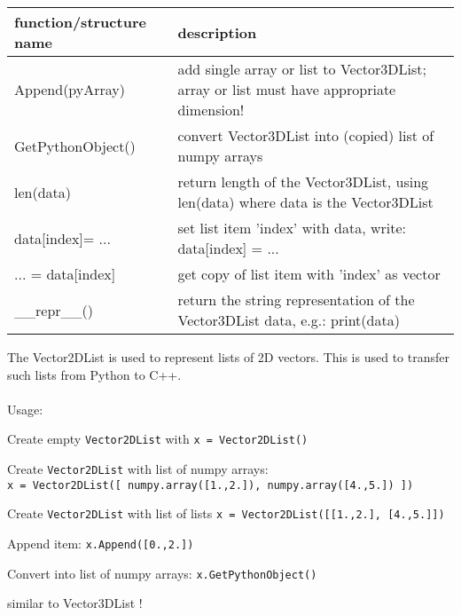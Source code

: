 \begin{center}
\footnotesize
\begin{longtable}{| p{8cm} | p{8cm} |} 
\hline
{\bf function/structure name} & {\bf description}\\ \hline
  Append(pyArray) & add single array or list to Vector3DList; array or list must have appropriate dimension!\\ \hline 
  GetPythonObject() & convert Vector3DList into (copied) list of numpy arrays\\ \hline 
  len(data) & return length of the Vector3DList, using len(data) where data is the Vector3DList\\ \hline 
  data[index]= ... & set list item 'index' with data, write: data[index] = ...\\ \hline 
  ... = data[index] & get copy of list item with 'index' as vector\\ \hline 
  \_\_repr\_\_() & return the string representation of the Vector3DList data, e.g.: print(data)\\ \hline 
\end{longtable}
\end{center}

The Vector2DList is used to represent lists of 2D vectors. This is used to transfer such lists from Python to C++. \\ \\ Usage: \bi
  \item Create empty \texttt{Vector2DList} with \texttt{x = Vector2DList()} 
  \item Create \texttt{Vector2DList} with list of numpy arrays:\\ \texttt{x = Vector2DList([ numpy.array([1.,2.]), numpy.array([4.,5.]) ])}
  \item Create \texttt{Vector2DList} with list of lists \texttt{x = Vector2DList([[1.,2.], [4.,5.]])}
  \item Append item: \texttt{x.Append([0.,2.])}
  \item Convert into list of numpy arrays: \texttt{x.GetPythonObject()}
  \item similar to Vector3DList !
\ei


